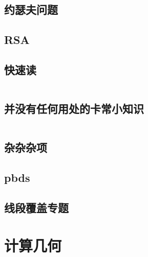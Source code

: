 \documentclass[a4paper,11pt]{article}
\begin{document}
    \subsection{约瑟夫问题}
    

    \subsection{RSA}
    

    \subsection{快速读}
    \inputminted[breaklines]{c++}{Others/quick_IO.cpp}

    \subsection{并没有任何用处的卡常小知识}
    \inputminted[breaklines]{c++}{Others/并没有任何用处的卡常小知识.cpp}

    \subsection{杂杂杂项}
    

    \subsection{pbds}
    
    
     \subsection{线段覆盖专题}
    




    \newpage
    \section{计算几何}


\end{document}
